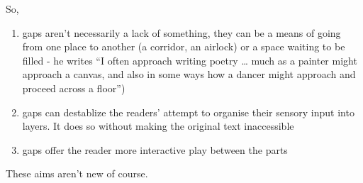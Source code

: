 \documentclass[11pt]{article}
\begin{document}
So,

\begin{enumerate}

\item gaps aren't necessarily a lack of something, they can be a means of going from one place to another (a corridor, an airlock) or a space waiting to be filled - he writes ``I often approach writing poetry … much as a painter might approach a canvas, and also in some ways how a dancer might approach and proceed across a floor'')
\item gaps can destablize the readers' attempt to organise their sensory input into layers. It does so without making the original text inaccessible
\item gaps offer the reader more interactive play between the parts
\end{enumerate}

These aims aren't new of course.
\end{document}
